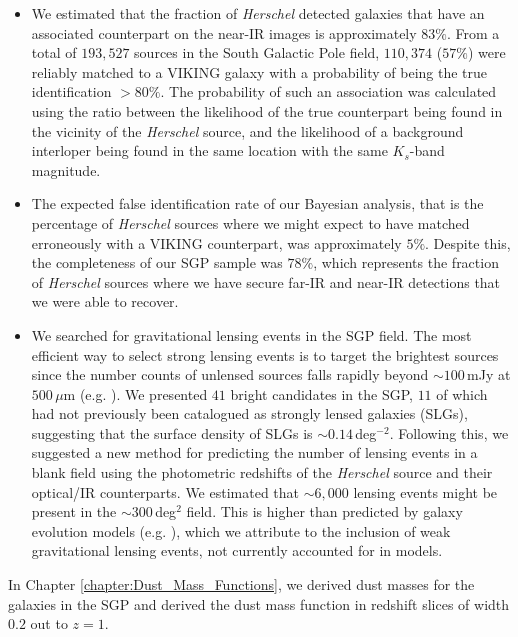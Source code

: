 \begin{itemize}
    \item We estimated that the fraction of \textit{Herschel} detected galaxies that have an associated counterpart on the near-IR images is approximately $83\%$. From a total of $193,527$ sources in the South Galactic Pole field, $110,374$ ($57\%$) were reliably matched to a VIKING galaxy with a probability of being the true identification $> 80\%$. The probability of such an association was calculated using the ratio between the likelihood of the true counterpart being found in the vicinity of the \textit{Herschel} source, and the likelihood of a background interloper being found in the same location with the same $K_s$-band magnitude.
    \item The expected false identification rate of our Bayesian analysis, that is the percentage of \textit{Herschel} sources where we might expect to have matched erroneously with a VIKING counterpart, was approximately $5\%$. Despite this, the completeness of our SGP sample was $78\%$, which represents the fraction of \textit{Herschel} sources where we have secure far-IR and near-IR detections that we were able to recover.
    \item We searched for gravitational lensing events in the SGP field. The most efficient way to select strong lensing events is to target the brightest sources since the number counts of unlensed sources falls rapidly beyond $\sim100\,$mJy at $500\,\mu$m (e.g. \citealt{Vieira_2010, Wardlow_2013, Nayyeri_2016, Negrello_2017}). We presented $41$ bright candidates in the SGP, $11$ of which had not previously been catalogued as strongly lensed galaxies (SLGs), suggesting that the surface density of SLGs is $\sim0.14\,$deg$^{-2}$. Following this, we suggested a new method for predicting the number of lensing events in a blank field using the photometric redshifts of the \textit{Herschel} source and their optical/IR counterparts. We estimated that $\sim6,000$ lensing events might be present in the $\sim300\,$deg$^{2}$ field. This is higher than predicted by galaxy evolution models (e.g. \citealt{Negrello_2007, Cai_2013}), which we attribute to the inclusion of weak gravitational lensing events, not currently accounted for in models.
\end{itemize}

In Chapter \ref{chapter:Dust_Mass_Functions}, we derived dust masses for the galaxies in the SGP and derived the dust mass function in redshift slices of width $0.2$ out to $z = 1$.

